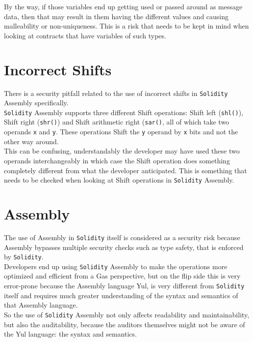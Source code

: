 By the way, if those variables end up getting used or passed around as message data, then that may result in them having the different values and causing malleability or non-uniqueness. This is a risk that needs to be kept in mind when looking at contracts that have variables of such types.

\section{Incorrect Shifts}
There is a security pitfall related to the use of incorrect shifts in \texttt{Solidity} Assembly specifically.\\

\texttt{Solidity} Assembly supports three different Shift operations: Shift left (\texttt{shl()}), Shift right (\texttt{shr()}) and Shift arithmetic right (\texttt{sar()}, all of which take two operands \texttt{x} and \texttt{y}. These operations Shift the \texttt{y} operand by \texttt{x} bits and not the other way around. \\

This can be confusing, understandably the developer may have used these two operands interchangeably in which case the Shift operation does something completely different from what the developer anticipated. This is something that needs to be checked when looking at Shift operations in \texttt{Solidity} Assembly.

\section{Assembly}
The use of Assembly in \texttt{Solidity} itself is considered as a security risk because Assembly bypasses multiple security checks such as type safety, that is enforced by \texttt{Solidity}.\\

Developers end up using \texttt{Solidity} Assembly to make the operations more optimized and efficient from a Gas perspective, but on the flip side this is very error-prone because the Assembly language Yul, is very different from \texttt{Solidity} itself and requires much greater understanding of the syntax and semantics of that Assembly language.\\

So the use of \texttt{Solidity} Assembly not only affects readability and maintainability, but also the auditability, because the auditors themselves might not be aware of the Yul language: the syntax and semantics. \\

